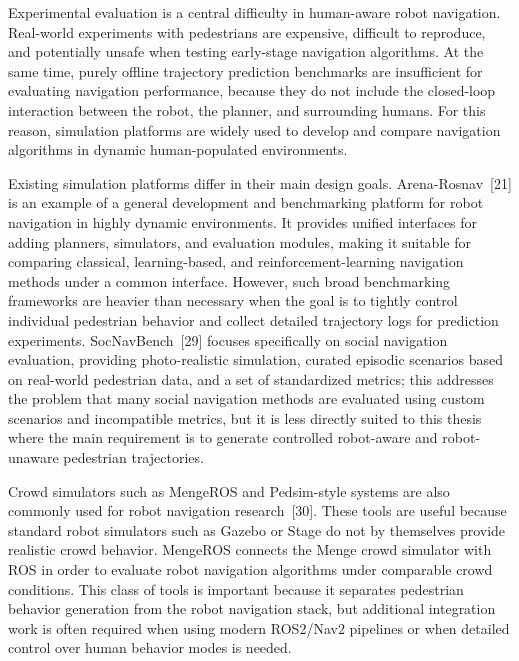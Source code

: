 \documentclass[12pt, a4paper]{article}
\begin{document}
Experimental evaluation is a central difficulty in human-aware robot navigation. Real-world experiments with pedestrians are expensive, difficult to reproduce, and potentially unsafe when testing early-stage navigation algorithms. At the same time, purely offline trajectory prediction benchmarks are insufficient for evaluating navigation performance, because they do not include the closed-loop interaction between the robot, the planner, and surrounding humans. For this reason, simulation platforms are widely used to develop and compare navigation algorithms in dynamic human-populated environments.

Existing simulation platforms differ in their main design goals. Arena-Rosnav~[21] is an example of a general development and benchmarking platform for robot navigation in highly dynamic environments. It provides unified interfaces for adding planners, simulators, and evaluation modules, making it suitable for comparing classical, learning-based, and reinforcement-learning navigation methods under a common interface. However, such broad benchmarking frameworks are heavier than necessary when the goal is to tightly control individual pedestrian behavior and collect detailed trajectory logs for prediction experiments. SocNavBench~[29] focuses specifically on social navigation evaluation, providing photo-realistic simulation, curated episodic scenarios based on real-world pedestrian data, and a set of standardized metrics; this addresses the problem that many social navigation methods are evaluated using custom scenarios and incompatible metrics, but it is less directly suited to this thesis where the main requirement is to generate controlled robot-aware and robot-unaware pedestrian trajectories.

Crowd simulators such as MengeROS and Pedsim-style systems are also commonly used for robot navigation research~[30]. These tools are useful because standard robot simulators such as Gazebo or Stage do not by themselves provide realistic crowd behavior. MengeROS connects the Menge crowd simulator with ROS in order to evaluate robot navigation algorithms under comparable crowd conditions. This class of tools is important because it separates pedestrian behavior generation from the robot navigation stack, but additional integration work is often required when using modern ROS2/Nav2 pipelines or when detailed control over human behavior modes is needed.
\end{document}
